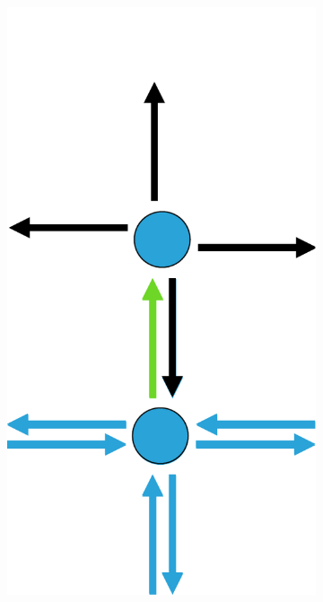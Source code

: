 \documentclass[12pt]{article}
\begin{document}
\begin{figure}[tb]
\begin{subfigure}[b]{0.15\textwidth}
      \includegraphics[width=\textwidth]{img/3}
      \caption{}\label{fig:contraction_kernel_greedy3}
  \end{subfigure}
  ~
  \begin{subfigure}[b]{0.15\textwidth}

\end{subfigure}
\end{figure}
\end{document}
